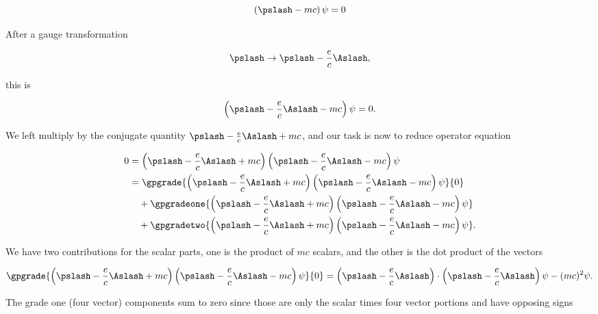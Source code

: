 \begin{equation}\label{eqn:diracCovariant:150}
\left(\pslash - m c \right) \psi = 0
\end{equation}

After a gauge transformation

\begin{equation}\label{eqn:diracCovariant:170}
\pslash \rightarrow \pslash - \frac{e}{c} \Aslash,
\end{equation}

this is

\begin{equation}\label{eqn:diracCovariant:190}
\left(\pslash - \frac{e}{c}\Aslash - m c \right) \psi = 0.
\end{equation}

We left multiply by the conjugate quantity $\pslash - \frac{e}{c}\Aslash + m c$, and our task is now to reduce operator equation

\begin{equation}\label{eqn:diracCovariant:210}
\begin{aligned}
0 
&= \left(\pslash - \frac{e}{c}\Aslash + m c \right) \left(\pslash - \frac{e}{c}\Aslash - m c \right) \psi \\
&= 
\gpgrade{
\left(\pslash - \frac{e}{c}\Aslash + m c \right) \left(\pslash - \frac{e}{c}\Aslash - m c \right) \psi
}{0} \\
&\quad +\gpgradeone{
\left(\pslash - \frac{e}{c}\Aslash + m c \right) \left(\pslash - \frac{e}{c}\Aslash - m c \right) \psi
} \\
&\quad +\gpgradetwo{
\left(\pslash - \frac{e}{c}\Aslash + m c \right) \left(\pslash - \frac{e}{c}\Aslash - m c \right) \psi
}.
\end{aligned}
\end{equation}

We have two contributions for the scalar parts, one is the product of $mc$ scalars, and the other is the dot product of the vectors

\begin{equation}\label{eqn:diracCovariant:230}
\gpgrade{
\left(\pslash - \frac{e}{c}\Aslash + m c \right) \left(\pslash - \frac{e}{c}\Aslash - m c \right) \psi
}{0}
=
\left(\pslash - \frac{e}{c}\Aslash \right) \cdot \left(\pslash - \frac{e}{c}\Aslash \right) \psi
- (m c)^2 \psi.
\end{equation}

The grade one (four vector) components sum to zero since those are only the scalar times four vector portions and have opposing signs

